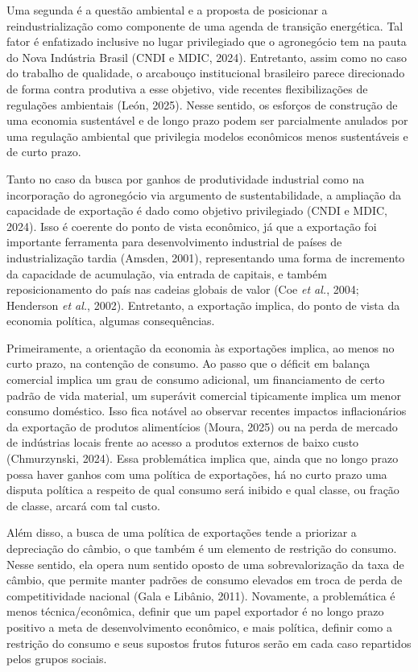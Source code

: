 Uma segunda é a questão ambiental e a proposta de posicionar a
reindustrialização como componente de uma agenda de transição
energética. Tal fator é enfatizado inclusive no lugar privilegiado que o
agronegócio tem na pauta do Nova Indústria Brasil (CNDI e MDIC, 2024).
Entretanto, assim como no caso do trabalho de qualidade, o arcabouço
institucional brasileiro parece direcionado de forma contra produtiva a
esse objetivo, vide recentes flexibilizações de regulações ambientais
(León, 2025). Nesse sentido, os esforços de construção de uma economia
sustentável e de longo prazo podem ser parcialmente anulados por uma
regulação ambiental que privilegia modelos econômicos menos sustentáveis
e de curto prazo.

Tanto no caso da busca por ganhos de produtividade industrial como na
incorporação do agronegócio via argumento de sustentabilidade, a
ampliação da capacidade de exportação é dado como objetivo privilegiado
(CNDI e MDIC, 2024). Isso é coerente do ponto de vista econômico, já que
a exportação foi importante ferramenta para desenvolvimento industrial
de países de industrialização tardia (Amsden, 2001), representando uma
forma de incremento da capacidade de acumulação, via entrada de
capitais, e também reposicionamento do país nas cadeias globais de valor
(Coe \emph{et al.}, 2004; Henderson \emph{et al.}, 2002). Entretanto, a
exportação implica, do ponto de vista da economia política, algumas
consequências.

Primeiramente, a orientação da economia às exportações implica, ao menos
no curto prazo, na contenção de consumo. Ao passo que o déficit em
balança comercial implica um grau de consumo adicional, um financiamento
de certo padrão de vida material, um superávit comercial tipicamente
implica um menor consumo doméstico. Isso fica notável ao observar
recentes impactos inflacionários da exportação de produtos alimentícios
(Moura, 2025) ou na perda de mercado de indústrias locais frente ao
acesso a produtos externos de baixo custo (Chmurzynski, 2024). Essa
problemática implica que, ainda que no longo prazo possa haver ganhos
com uma política de exportações, há no curto prazo uma disputa política
a respeito de qual consumo será inibido e qual classe, ou fração de
classe, arcará com tal custo.

Além disso, a busca de uma política de exportações tende a priorizar a
depreciação do câmbio, o que também é um elemento de restrição do
consumo. Nesse sentido, ela opera num sentido oposto de uma
sobrevalorização da taxa de câmbio, que permite manter padrões de
consumo elevados em troca de perda de competitividade nacional (Gala e
Libânio, 2011). Novamente, a problemática é menos técnica/econômica,
definir que um papel exportador é no longo prazo positivo a meta de
desenvolvimento econômico, e mais política, definir como a restrição do
consumo e seus supostos frutos futuros serão em cada caso repartidos
pelos grupos sociais.

